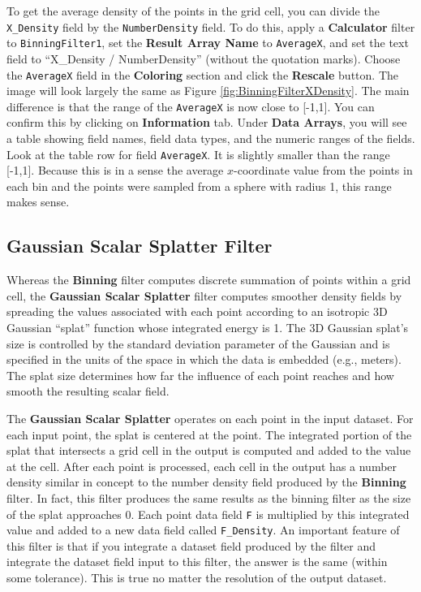\documentclass[12pt]{article}
\newcommand{\filter}[1]{\textbf{#1}}
\newcommand{\filterinstance}[1]{\texttt{#1}}
\newcommand{\setting}[1]{\textbf{#1}}
\newcommand{\field}[1]{\texttt{#1}}
\begin{document}
To get the average density of the points in the grid cell, you can divide the \field{X\_Density} field by the \field{NumberDensity} field. To do this, apply a \filter{Calculator} filter to \filterinstance{BinningFilter1}, set the \setting{Result Array Name} to \field{AverageX}, and set the text field to ``X\_Density / NumberDensity'' (without the quotation marks).  Choose the \field{AverageX} field in the \setting{Coloring} section and click the \setting{Rescale} button. The image will look largely the same as Figure \ref{fig:BinningFilterXDensity}. The main difference is that the range of the \field{AverageX} is now close to [-1,1]. You can confirm this by clicking on \textbf{Information} tab. Under \setting{Data Arrays}, you will see a table showing field names, field data types, and the numeric ranges of the fields. Look at the table row for field \field{AverageX}. It is slightly smaller than the range [-1,1]. Because this is in a sense the average $x$-coordinate value from the points in each bin and the points were sampled from a sphere with radius 1, this range makes sense. 

\subsection{Gaussian Scalar Splatter Filter}

Whereas the \filter{Binning} filter computes discrete summation of points within a grid cell, the \filter{Gaussian Scalar Splatter} filter computes smoother density fields by spreading the values associated with each point according to an isotropic 3D Gaussian ``splat'' function whose integrated energy is 1. The 3D Gaussian splat's size is controlled by the standard deviation parameter of the Gaussian and is specified in the units of the space in which the data is embedded (e.g., meters). The splat size determines how far the influence of each point reaches and how smooth the resulting scalar field.

The \filter{Gaussian Scalar Splatter} operates on each point in the input dataset. For each input point, the splat is centered at the point. The integrated portion of the splat that intersects a grid cell in the output is computed and added to the value at the cell. After each point is processed, each cell in the output has a number density similar in concept to the number density field produced by the \filter{Binning} filter. In fact, this filter produces the same results as the binning filter as the size of the splat approaches 0. Each point data field \field{F} is multiplied by this integrated value and added to a new data field called \field{F\_Density}. An important feature of this filter is that if you integrate a dataset field produced by the filter and integrate the dataset field input to this filter, the answer is the same (within some tolerance). This is true no matter the resolution of the output dataset.
\end{document}
